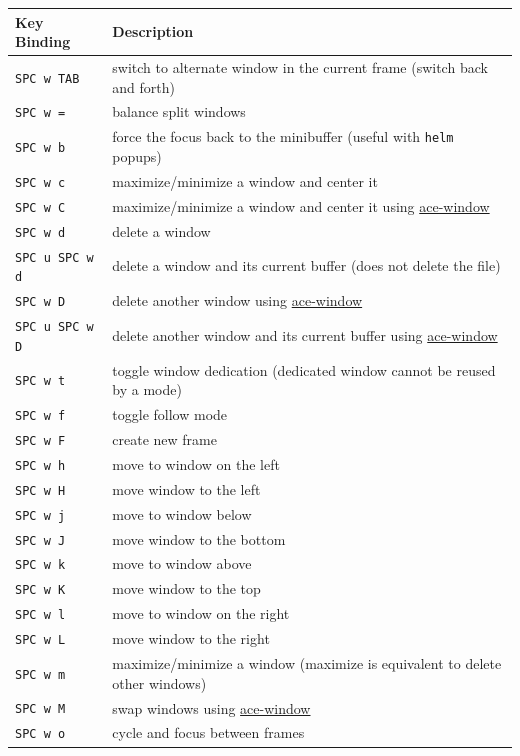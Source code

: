 \documentclass[11pt]{article}
\begin{document}
\begin{enumerate}
\begin{center}
\begin{tabular}{ll}
Key Binding & Description\\
\hline
\texttt{SPC w TAB} & switch to alternate window in the current frame (switch back and forth)\\
\texttt{SPC w =} & balance split windows\\
\texttt{SPC w b} & force the focus back to the minibuffer (useful with \texttt{helm} popups)\\
\texttt{SPC w c} & maximize/minimize a window and center it\\
\texttt{SPC w C} & maximize/minimize a window and center it using \href{https://github.com/abo-abo/ace-window}{ace-window}\\
\texttt{SPC w d} & delete a window\\
\texttt{SPC u SPC w d} & delete a window and its current buffer (does not delete the file)\\
\texttt{SPC w D} & delete another window using \href{https://github.com/abo-abo/ace-window}{ace-window}\\
\texttt{SPC u SPC w D} & delete another window and its current buffer using \href{https://github.com/abo-abo/ace-window}{ace-window}\\
\texttt{SPC w t} & toggle window dedication (dedicated window cannot be reused by a mode)\\
\texttt{SPC w f} & toggle follow mode\\
\texttt{SPC w F} & create new frame\\
\texttt{SPC w h} & move to window on the left\\
\texttt{SPC w H} & move window to the left\\
\texttt{SPC w j} & move to window below\\
\texttt{SPC w J} & move window to the bottom\\
\texttt{SPC w k} & move to window above\\
\texttt{SPC w K} & move window to the top\\
\texttt{SPC w l} & move to window on the right\\
\texttt{SPC w L} & move window to the right\\
\texttt{SPC w m} & maximize/minimize a window (maximize is equivalent to delete other windows)\\
\texttt{SPC w M} & swap windows using \href{https://github.com/abo-abo/ace-window}{ace-window}\\
\texttt{SPC w o} & cycle and focus between frames\\

\end{tabular}
\end{center}
\end{enumerate}
\end{document}
